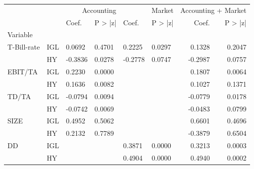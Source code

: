 \begin{tabular}{llllllrr}
\toprule
 &  & \multicolumn{2}{r}{Accounting} & \multicolumn{2}{r}{Market} & \multicolumn{2}{r}{Accounting + Market} \\
 &  & Coef. & P > |z| & Coef. & P > |z| & Coef. & P > |z| \\
Variable &  &  &  &  &  &  &  \\
\midrule
\multirow[t]{2}{*}{T-Bill-rate} & IGL & 0.0692 & 0.4701 & 0.2225 & 0.0297 & 0.1328 & 0.2047 \\
 & HY & -0.3836 & 0.0278 & -0.2778 & 0.0747 & -0.2987 & 0.0757 \\
\cline{1-8}
\multirow[t]{2}{*}{EBIT/TA} & IGL & 0.2230 & 0.0000 &  &  & 0.1807 & 0.0064 \\
 & HY & 0.1636 & 0.0082 &  &  & 0.1027 & 0.1371 \\
\cline{1-8}
\multirow[t]{2}{*}{TD/TA} & IGL & -0.0794 & 0.0094 &  &  & -0.0779 & 0.0178 \\
 & HY & -0.0742 & 0.0069 &  &  & -0.0483 & 0.0799 \\
\cline{1-8}
\multirow[t]{2}{*}{SIZE} & IGL & 0.4952 & 0.5062 &  &  & 0.6601 & 0.4696 \\
 & HY & 0.2132 & 0.7789 &  &  & -0.3879 & 0.6504 \\
\cline{1-8}
\multirow[t]{2}{*}{DD} & IGL &  &  & 0.3871 & 0.0000 & 0.3213 & 0.0003 \\
 & HY &  &  & 0.4904 & 0.0000 & 0.4940 & 0.0002 \\
\cline{1-8}
\bottomrule
\end{tabular}

